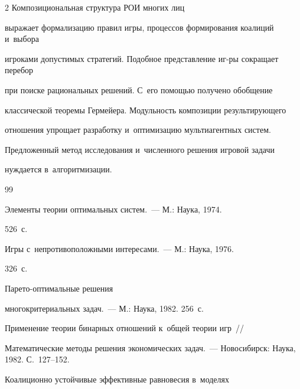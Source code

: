 \begin{multicols}{2}
    Композициональная структура РОИ многих лиц 

выражает формализацию правил игры, процессов формирования коалиций и~выбора 

игроками до\-пус\-ти\-мых стратегий. Подобное представление иг-\linebreak ры сокращает перебор 

при поиске рациональных решений. С~его по\-мощью получено обобщение 

классической тео\-ре\-мы Гермейера. Мо\-дуль\-ность композиции ре\-зуль\-ти\-ру\-юще\-го 

отношения упро\-щает разработку и~оптимизацию муль\-ти\-агент\-ных сис\-тем. 

Пред\-ло\-жен\-ный метод исследования и~чис\-лен\-но\-го решения игровой задачи 

нуж\-да\-ет\-ся в~алгоритмизации. 

    

{\small\frenchspacing

 {%


 \begin{thebibliography}{99}




 Элементы теории оптимальных сис\-тем.~--- М.: Наука, 1974. 

526~с.




 Игры с~непротивоположными интересами.~--- М.: Наука, 1976. 

326~с.




 Па\-ре\-то-оп\-ти\-маль\-ные решения 

многокритериальных задач.~--- М.: Наука, 1982. 256~с.


 Применение тео\-рии бинарных отношений к~об\-щей тео\-рии игр~// 

Математические методы решения экономических задач.~--- Новосибирск: Наука, 1982. С.~127--152.


 Коалиционно устойчивые эффективные равновесия в~моделях 


\end{thebibliography}}}
\end{multicols}
